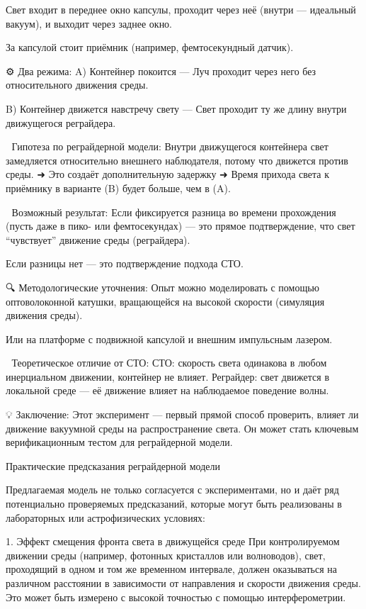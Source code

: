 \documentclass[12pt]{article}
\begin{document}
Свет входит в переднее окно капсулы, проходит через неё (внутри — идеальный вакуум), и выходит через заднее окно.

За капсулой стоит приёмник (например, фемтосекундный датчик).

⚙️ Два режима:
A) Контейнер покоится
— Луч проходит через него без относительного движения среды.

B) Контейнер движется навстречу свету
— Свет проходит ту же длину внутри движущегося реграйдера.

📏 Гипотеза по реграйдерной модели:
Внутри движущегося контейнера свет замедляется относительно внешнего наблюдателя, потому что движется против среды.
➜ Это создаёт дополнительную задержку
➜ Время прихода света к приёмнику в варианте (B) будет больше, чем в (A).

🧪 Возможный результат:
Если фиксируется разница во времени прохождения (пусть даже в пико- или фемтосекундах) — это прямое подтверждение, что свет “чувствует” движение среды (реграйдера).

Если разницы нет — это подтверждение подхода СТО.

🔍 Методологические уточнения:
Опыт можно моделировать с помощью оптоволоконной катушки, вращающейся на высокой скорости (симуляция движения среды).

Или на платформе с подвижной капсулой и внешним импульсным лазером.

🧩 Теоретическое отличие от СТО:
СТО: скорость света одинакова в любом инерциальном движении, контейнер не влияет.
Реграйдер: свет движется в локальной среде — её движение влияет на наблюдаемое поведение волны.

💡 Заключение:
Этот эксперимент — первый прямой способ проверить, влияет ли движение вакуумной среды на распространение света.
Он может стать ключевым верификационным тестом для реграйдерной модели.


Практические предсказания реграйдерной модели

Предлагаемая модель не только согласуется с экспериментами, но и даёт ряд потенциально проверяемых предсказаний, которые могут быть реализованы в лабораторных или астрофизических условиях:

1. Эффект смещения фронта света в движущейся среде
При контролируемом движении среды (например, фотонных кристаллов или волноводов), свет, проходящий в одном и том же временном интервале, должен оказываться на различном расстоянии в зависимости от направления и скорости движения среды. Это может быть измерено с высокой точностью с помощью интерферометрии.
\end{document}
